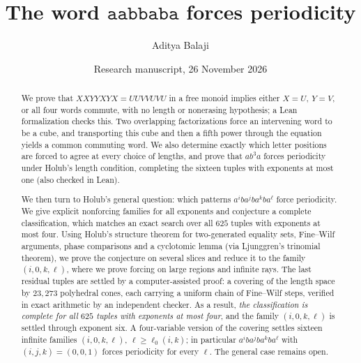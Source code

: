 \documentclass[10pt]{article}
\title{The word \(\mathtt{aabbaba}\) forces periodicity}
\author{Aditya Balaji}
\date{Research manuscript, 26 November 2026}
\theoremstyle{remark}\newtheorem*{remark}{Remark}
\begin{document}
\maketitle
\begin{abstract}
We prove that \(XXYYXYX=UUVVUVU\) in a free monoid implies either \(X=U,\ Y=V\), or all four words commute, with no length or nonerasing hypothesis; a Lean formalization checks this. Two overlapping factorizations force an intervening word to be a cube, and transporting this cube and then a fifth power through the equation yields a common commuting word. We also determine exactly which letter positions are forced to agree at every choice of lengths, and prove that \(ab^3a\) forces periodicity under Holub's length condition, completing the sixteen tuples with exponents at most one (also checked in Lean).

We then turn to Holub's general question: which patterns \(a^iba^jba^kba^\ell\) force periodicity. We give explicit nonforcing families for all exponents and conjecture a complete classification, which matches an exact search over all \(625\) tuples with exponents at most four. Using Holub's structure theorem for two-generated equality sets, Fine--Wilf arguments, phase comparisons and a cyclotomic lemma (via Ljunggren's trinomial theorem), we prove the conjecture on several slices and reduce it to the family \((i,0,k,\ell)\), where we prove forcing on large regions and infinite rays. The last residual tuples are settled by a computer-assisted proof: a covering of the length space by \(23{,}273\) polyhedral cones, each carrying a uniform chain of Fine--Wilf steps, verified in exact arithmetic by an independent checker. As a result, \emph{the classification is complete for all \(625\) tuples with exponents at most four}, and the family \((i,0,k,\ell)\) is settled through exponent six. A four-variable version of the covering settles sixteen infinite families \((i,0,k,\ell)\), \(\ell\ge\ell_0(i,k)\); in particular \(a^iba^jba^kba^\ell\) with \((i,j,k)=(0,0,1)\) forces periodicity for every \(\ell\). The general case remains open.
\end{abstract}
\end{document}
